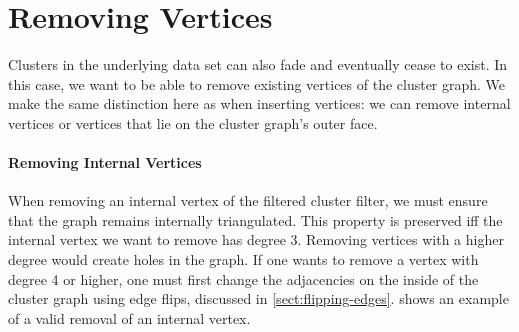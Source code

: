 \section{Removing Vertices}
\label{sect:removing-vertices}

Clusters in the underlying data set can also fade and eventually cease to exist.
In this case, we want to be able to remove existing vertices of the cluster graph.
We make the same distinction here as when inserting vertices: we can remove internal vertices or vertices that lie on the cluster graph's outer face.




\paragraph{Removing Internal Vertices}

When removing an internal vertex of the filtered cluster filter, we must ensure that the graph remains internally triangulated.
This property is preserved iff the internal vertex we want to remove has degree 3.
Removing vertices with a higher degree would create holes in the graph.
If one wants to remove a vertex with degree 4 or higher, one must first change the adjacencies on the inside of the cluster graph using edge flips, discussed in \cref{sect:flipping-edges}.
 shows an example of a valid removal of an internal vertex.

